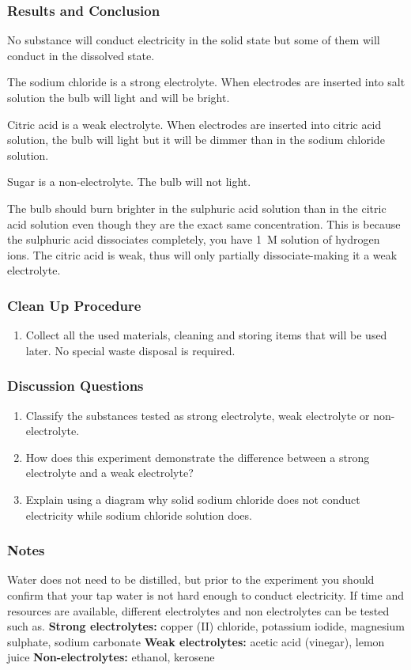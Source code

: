 \subsubsection*{Results and Conclusion}
No substance will conduct electricity in the solid state but some of them will conduct in the dissolved state.

The sodium chloride is a strong electrolyte. When electrodes are inserted into salt solution the bulb will light and will be bright.

Citric acid is a weak electrolyte. When electrodes are inserted into citric acid solution, the bulb will light but it will be dimmer than in the sodium chloride solution.

Sugar is a non-electrolyte. The bulb will not light.

The bulb should burn brighter in the sulphuric acid solution than in the citric acid solution even though they are the exact same concentration. This is because the sulphuric acid dissociates completely, you have 1~M solution of hydrogen ions. The citric acid is weak, thus will only partially dissociate-making it a weak electrolyte.

\subsubsection*{Clean Up Procedure}
\begin{enumerate}
\item{Collect all the used materials, cleaning and storing items that will be used later. No special waste disposal is required.}
\end{enumerate}

\subsubsection*{Discussion Questions}
\begin{enumerate}
\item{Classify the substances tested as strong electrolyte, weak electrolyte or non-electrolyte.}
\item{How does this experiment demonstrate the difference between a strong electrolyte and a weak electrolyte?}
\item{Explain using a diagram why solid sodium chloride does not conduct electricity while sodium chloride solution does.}
\end{enumerate}

\subsubsection*{Notes}
Water does not need to be distilled, but prior to the experiment you should confirm that your tap water is not hard enough to conduct electricity.
If time and resources are available, different electrolytes and non electrolytes can be tested such as.
\textbf{Strong electrolytes:} copper (II) chloride, potassium iodide, magnesium sulphate, sodium carbonate
\textbf{Weak electrolytes:} acetic acid (vinegar), lemon juice
\textbf{Non-electrolytes:} ethanol, kerosene

